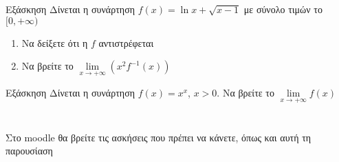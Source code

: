 \documentclass[greek]{beamer}
\begin{document}
\begin{frame}{Εξάσκηση}
 Δίνεται η συνάρτηση $f(x)=\ln x + \sqrt{x-1}$ με σύνολο τιμών το $[0,+\infty)$
 \begin{enumerate}
  \item Να δείξετε ότι η $f$ αντιστρέφεται \pause
  \item Να βρείτε το $\lim\limits_{x \to +\infty}{ \left( x^2f^{-1}(x) \right)  }$
 \end{enumerate}
\end{frame}

\begin{frame}{Εξάσκηση}
 Δίνεται η συνάρτηση $f(x)=x^x$, $x>0$. Να βρείτε το $\lim\limits_{x \to +\infty}{ f(x)  }$
\end{frame}

\section{}
\begin{frame}
 Στο moodle θα βρείτε τις ασκήσεις που πρέπει να κάνετε, όπως και αυτή τη παρουσίαση
\end{frame}
\end{document}
